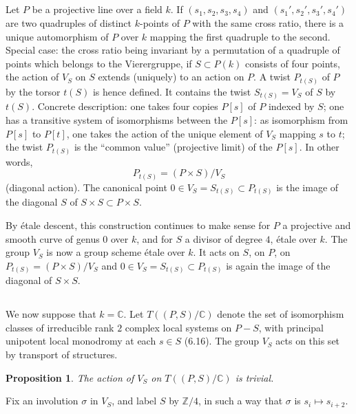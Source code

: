 \documentclass[11pt,a4paper]{article}
\theoremstyle{plain}
\newtheorem{proposition}[theorem]{Proposition}
\theoremstyle{definition}
\newcommand{\Z}{\mathbb{Z}}
\newcommand{\C}{\mathbb{C}}
\begin{document}
\subsection{}
Let $P$ be a projective line over a field $k$. If $(s_1, s_2, s_3, s_4)$ and $(s_1', s_2', s_3', s_4')$ are two quadruples of distinct $k$-points of $P$ with the same cross ratio, there is a unique automorphism of $P$ over $k$ mapping the first quadruple to the second. Special case: the cross ratio being invariant by a permutation of a quadruple of points which belongs to the Vierergruppe, if $S \subset P(k)$ consists of four points, the action of $V_S$ on $S$ extends (uniquely) to an action on $P$. A twist $P_{t(S)}$ of $P$ by the torsor $t(S)$ is hence defined. It contains the twist $S_{t(S)} = V_S$ of $S$ by $t(S)$. Concrete description: one takes four copies $P[s]$ of $P$ indexed by $S$; one has a transitive system of isomorphisms between the $P[s]$: as isomorphism from $P[s]$ to $P[t]$, one takes the action of the unique element of $V_S$ mapping $s$ to $t$; the twist $P_{t(S)}$ is the ``common value'' (projective limit) of the $P[s]$. In other words,
\[
P_{t(S)} = (P \times S) / V_S
\]
(diagonal action). The canonical point $0 \in V_S = S_{t(S)} \subset P_{t(S)}$ is the image of the diagonal $S$ of $S \times S \subset P \times S$.

By \'etale descent, this construction continues to make sense for $P$ a projective and smooth curve of genus $0$ over $k$, and for $S$ a divisor of degree $4$, \'etale over $k$. The group $V_S$ is now a group scheme \'etale over $k$. It acts on $S$, on $P$, on $P_{t(S)} = (P \times S) / V_S$ and $0 \in V_S = S_{t(S)} \subset P_{t(S)}$ is again the image of the diagonal of $S \times S$.

\subsection{}
We now suppose that $k = \C$. Let $T((P,S)/\C)$ denote the set of isomorphism classes of irreducible rank $2$ complex local systems on $P - S$, with principal unipotent local monodromy at each $s \in S$ (6.16). The group $V_S$ acts on this set by transport of structures.

\begin{proposition}
The action of $V_S$ on $T((P,S)/\C)$ is trivial.
\end{proposition}

Fix an involution $\sigma$ in $V_S$, and label $S$ by $\Z/4$, in such a way that $\sigma$ is $s_i \mapsto s_{i+2}$.
\end{document}
